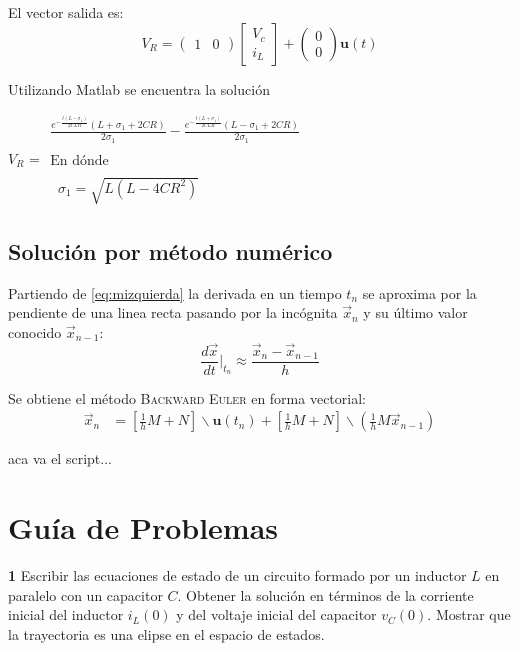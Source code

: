 \documentclass[10pt,a4paper]{article} %
\begin{document}
	El vector salida es:
	\begin{equation}
	V_R=\begin{pmatrix}
	1&0
	\end{pmatrix}\begin{bmatrix}
	V_c\\
	i_L
	\end{bmatrix}+\begin{pmatrix}
	0\\
	0
	\end{pmatrix}\textbf{u}(t)
	\end{equation}
	
	Utilizando Matlab se encuentra la solución 
	
	\begin{matlabsymbolicoutput}
		$V_R$ = 
		$\displaystyle \begin{array}{l}
		\frac{e^{-\frac{t {\left(L-\sigma_1 \right)}}{2 C L R}}  {\left(L+\sigma_1 +2 C R\right)}}{2 \sigma_1 }-\frac{e^{-\frac{t {\left(L+\sigma_1 \right)}}{2 C L R}}  {\left(L-\sigma_1 +2 C R\right)}}{2 \sigma_1 }\\
		\mathrm{}\\
		\textrm{En dónde}\\
		\mathrm{}\\
		\;\;\sigma_1 =\sqrt{L {\left(L-4 C R^2 \right)}}
		\end{array}$
	\end{matlabsymbolicoutput}
	
	\subsection{Solución por método numérico}
	Partiendo de \ref{eq:mizquierda} la derivada en un tiempo $t_n$ se aproxima por la pendiente de una linea recta pasando por la incógnita $\vec{x}_n$ y su último valor conocido $\vec{x}_{n-1}$:
	\begin{equation}
		\frac{d\vec{x}}{dt}\Bigr\rvert_{t_n}\approx\frac{\vec{x}_n-\vec{x}_{n-1}}{h}
	\end{equation}
	
	Se obtiene el método \textsc{Backward Euler} en forma vectorial:
	\begin{align}
		\vec{x}_n&=\left[\frac{1}{h}M+N\right]\backslash \textbf{u}(t_n)+\left[\frac{1}{h}M+N\right]\backslash \left(\frac{1}{h}M \vec{x}_{n-1}\right)\label{euler}
	\end{align}
	
	aca va el script...
	
 
	\section{Guía de Problemas}
	\textbf{1} Escribir las ecuaciones de estado de un circuito formado por un inductor $L$ en paralelo con un capacitor $C$. Obtener la solución en términos de la corriente inicial del inductor $i_L(0)$ y del voltaje inicial del capacitor $v_C(0)$. Mostrar que la trayectoria es una elipse en el espacio de estados.\\
	
\end{document}
